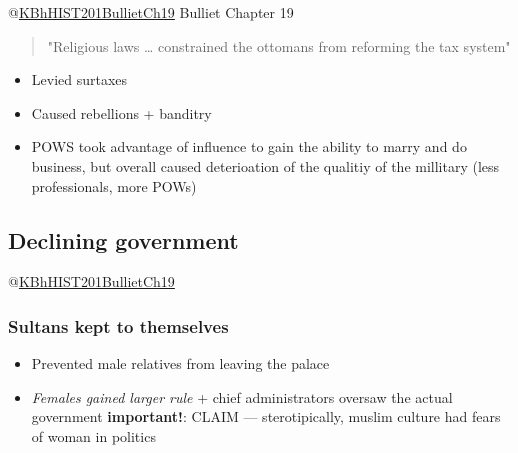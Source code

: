 \documentclass[letterpaper]{article}
\begin{document}
@\href{KBhHIST201BullietCh19.org}{KBhHIST201BullietCh19} Bulliet
Chapter 19

\begin{quote}
"Religious laws \ldots{} constrained the ottomans from reforming the tax
system"
\end{quote}

\begin{itemize}
\item Levied surtaxes
\item Caused rebellions + banditry
\item POWS took advantage of influence to gain the ability to marry and do
business, but overall caused deterioation of the qualitiy of the
millitary (less professionals, more POWs)
\end{itemize}

\subsection{Declining government}
\label{sec:orgd72ba18}
@\href{KBhHIST201BullietCh19.org}{KBhHIST201BullietCh19}

\subsubsection{Sultans kept to themselves}
\label{sec:org80cc9e8}
\begin{itemize}
\item Prevented male relatives from leaving the palace
\item \emph{Females gained larger rule} + chief administrators oversaw the actual
government \textbf{important!}: CLAIM --- sterotipically, muslim culture had
fears of woman in politics
\end{itemize}
\end{document}
